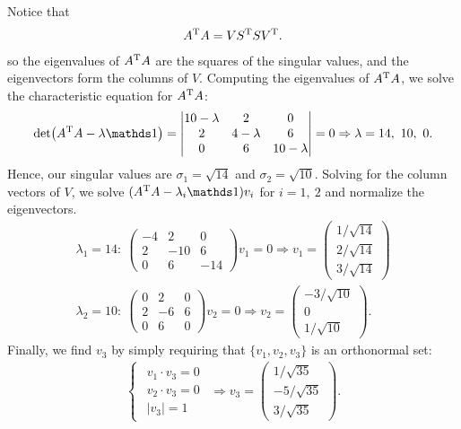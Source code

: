 Notice that 
\begin{eqnarray}
    \label{eq:A-AT}
    A^{\rm T} A = V S^{\rm T} S V^{\rm T}
.\end{eqnarray}
so the eigenvalues of $A^{\rm T} A$ are the squares of the singular values, and the eigenvectors form the columns of $V$. 
Computing the eigenvalues of $A^{\rm T} A$, we solve the characteristic equation for $A^{\rm T} A$:
\begin{eqnarray}
    \label{eq:AT-A}
    \det(A^{\rm T} A - \lambda \id) = 
    \begin{vmatrix}
        10 - \lambda & 2 & 0 \\
        2  & 4 - \lambda & 6 \\
        0  & 6 & 10 - \lambda 
    \end{vmatrix}
    =
    0
    \Rightarrow \lambda = 14,~10,~0
.\end{eqnarray}
Hence, our singular values are $\sigma_1 = \sqrt{14}$ and $\sigma_2 = \sqrt{10}$.
Solving for the column vectors of $V$, we solve $(A^{\rm T}A - \lambda_i \id) v_i$ for $i = 1,~2$ and normalize the eigenvectors.
\begin{align}
    \label{eq:v1-v2}
    \lambda_1 = 14:~
    \begin{pmatrix}
    -4 & 2 & 0 \\
    2 & -10 & 6 \\
    0 & 6 & -14
    \end{pmatrix}
    v_1
    = 0
    \Rightarrow v_1 = 
    \begin{pmatrix}
    1/\sqrt{14} \\ 2/\sqrt{14} \\ 3/\sqrt{14}
    \end{pmatrix} \\
    \lambda_2 = 10:~
    \begin{pmatrix}
    0 & 2 & 0 \\
    2 & -6 & 6 \\
    0 & 6 & 0
    \end{pmatrix}
    v_2
    = 0
    \Rightarrow v_2 = 
    \begin{pmatrix}
    -3/\sqrt{10} \\ 0 \\ 1/\sqrt{10} 
    \end{pmatrix} 
.\end{align}
Finally, we find $v_3$ by simply requiring that $\{ v_1,v_2,v_3 \} $ is an orthonormal set:
\begin{eqnarray}
    \label{eq:v3}
    \begin{cases}
    \begin{aligned}
    v_1 \cdot v_3 = 0 \\
    v_2 \cdot v_3 = 0 \\
    |v_3| = 1
    \end{aligned}
    \end{cases}
    \Rightarrow 
    v_3 =
    \begin{pmatrix}
    1/\sqrt{35} \\ -5/\sqrt{35} \\ 3/\sqrt{35}
    \end{pmatrix}
.\end{eqnarray}
